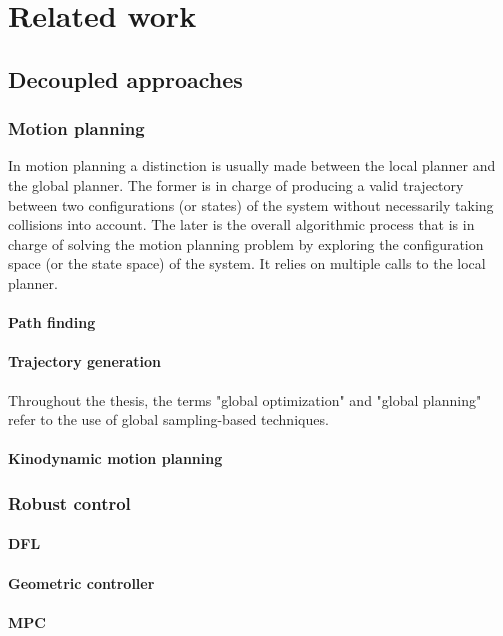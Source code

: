 \chapter{Related work}\label{chap:related_work}

\section{Decoupled approaches}
\subsection{Motion planning}
In motion planning a distinction is usually made between the local planner and the global planner. 
The former is in charge of producing a valid trajectory between two configurations (or states) of the system without necessarily taking collisions into account. 
The later is the overall algorithmic process that is in charge of solving the motion planning problem by exploring the configuration space (or the state space) of the system. 
It relies on multiple calls to the local planner.
\subsubsection{Path finding}
\subsubsection{Trajectory generation}
Throughout the thesis, the terms "global optimization" and "global planning" refer to the use of global sampling-based techniques.
\subsubsection{Kinodynamic motion planning}
\subsection{Robust control}
\subsubsection{DFL}
\subsubsection{Geometric controller}
\subsubsection{MPC}

